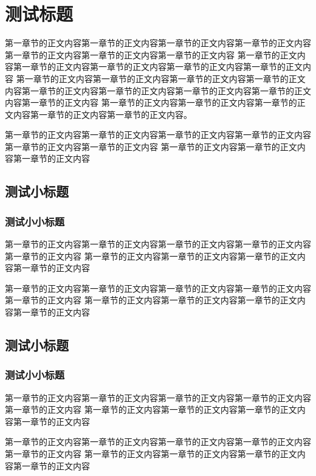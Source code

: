 \documentclass{yacaugrad}
\begin{document}
\section{测试标题}

第一章节的正文内容第一章节的正文内容第一章节的正文内容第一章节的正文内容第一章节的正文内容第一章节的正文内容第一章节的正文内容
第一章节的正文内容第一章节的正文内容第一章节的正文内容第一章节的正文内容第一章节的正文内容
第一章节的正文内容第一章节的正文内容第一章节的正文内容第一章节的正文内容第一章节的正文内容第一章节的正文内容第一章节的正文内容第一章节的正文内容第一章节的正文内容
第一章节的正文内容第一章节的正文内容第一章节的正文内容第一章节的正文内容第一章节的正文内容。

第一章节的正文内容第一章节的正文内容第一章节的正文内容第一章节的正文内容第一章节的正文内容第一章节的正文内容
第一章节的正文内容第一章节的正文内容第一章节的正文内容

\subsection{测试小标题}
\subsubsection{测试小小标题}

第一章节的正文内容第一章节的正文内容第一章节的正文内容第一章节的正文内容第一章节的正文内容
第一章节的正文内容第一章节的正文内容第一章节的正文内容第一章节的正文内容

第一章节的正文内容第一章节的正文内容第一章节的正文内容第一章节的正文内容第一章节的正文内容
第一章节的正文内容第一章节的正文内容第一章节的正文内容第一章节的正文内容

\subsection{测试小标题}
\subsubsection{测试小小标题}

第一章节的正文内容第一章节的正文内容第一章节的正文内容第一章节的正文内容第一章节的正文内容
第一章节的正文内容第一章节的正文内容第一章节的正文内容第一章节的正文内容

第一章节的正文内容第一章节的正文内容\cite{Huzhenzhen2018}第一章节的正文内容第一章节的正文内容第一章节的正文内容
第一章节的正文内容第一章节的正文内容第一章节的正文内容第一章节的正文内容
\end{document}

